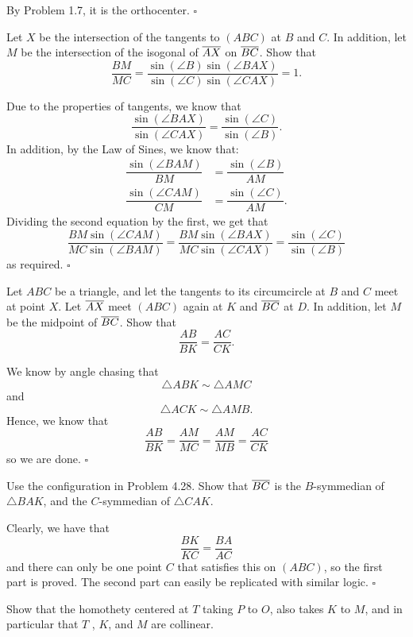 \documentclass{article}
\begin{document}
By Problem 1.7, it is the orthocenter. $\square$

\begin{problem}[4.25]{}
Let $X$ be the intersection of the tangents to $(ABC)$ at $B$ and $C$. In addition, let $M$ be the intersection of the isogonal of $\overline{AX}$ on $\overline{BC}$. Show that \[\dfrac{BM}{MC} = \dfrac{\sin(\angle B)\sin(\angle BAX)}{\sin(\angle C)\sin(\angle CAX)} = 1.\]
\end{problem}

Due to the properties of tangents, we know that \[\dfrac{\sin(\angle BAX)}{\sin(\angle CAX)} = \dfrac{\sin(\angle C)}{\sin(\angle B)}.\] In addition, by the Law of Sines, we know that:
\begin{align*}
\dfrac{\sin(\angle BAM)}{BM} &= \dfrac{\sin(\angle B)}{AM} \\
\dfrac{\sin(\angle CAM)}{CM} &= \dfrac{\sin(\angle C)}{AM}.
\end{align*}
Dividing the second equation by the first, we get that \[\dfrac{BM\sin(\angle CAM)}{MC\sin(\angle BAM)} = \dfrac{BM\sin(\angle BAX)}{MC\sin(\angle CAX)} = \dfrac{\sin(\angle C)}{\sin(\angle B)}\] as required. $\square$

\begin{problem}[4.28]{}
Let $ABC$ be a triangle, and let the tangents to its circumcircle at $B$ and $C$ meet at point $X$. Let $\overline{AX}$ meet $(ABC)$ again at $K$ and $\overline{BC}$ at $D$. In addition, let $M$ be the midpoint of $\overline{BC}$. Show that \[\dfrac{AB}{BK} = \dfrac{AC}{CK}.\]
\end{problem}

We know by angle chasing that \[\triangle ABK \sim \triangle AMC\] and \[\triangle ACK \sim \triangle AMB.\] Hence, we know that \[\dfrac{AB}{BK} = \dfrac{AM}{MC} = \dfrac{AM}{MB} = \dfrac{AC}{CK}\] so we are done. $\square$

\begin{problem}[4.29]{}
Use the configuration in Problem 4.28. Show that $\overline{BC}$ is the $B$-symmedian of $\triangle BAK$, and the $C$-symmedian of $\triangle CAK$.
\end{problem}

Clearly, we have that \[\dfrac{BK}{KC} = \dfrac{BA}{AC}\] and there can only be one point $C$ that satisfies this on $(ABC)$, so the first part is proved. The second part can easily be replicated with similar logic. $\square$

\newpage

\begin{problem}[4.31]{}
Show that the homothety centered at $T$ taking $P$ to $O$, also takes $K$ to $M$, and in particular that $T$ , $K$, and $M$ are collinear.
\end{problem}
\end{document}
